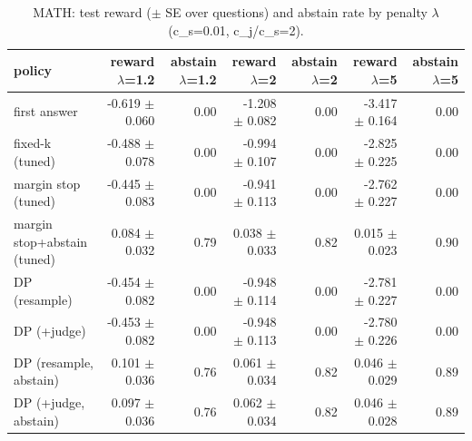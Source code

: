 \begin{table}[t]
\centering
\small
\caption{MATH: test reward ($\pm$ SE over questions) and abstain rate by penalty $\lambda$ (c\_s=0.01, c\_j/c\_s=2).}
\label{tab:reward_vs_lambda_math}
\begin{tabular}{lrrrrrr}
\toprule
policy & reward $\lambda$=1.2 & abstain $\lambda$=1.2 & reward $\lambda$=2 & abstain $\lambda$=2 & reward $\lambda$=5 & abstain $\lambda$=5 \\
\midrule
first answer & -0.619 $\pm$ 0.060 & 0.00 & -1.208 $\pm$ 0.082 & 0.00 & -3.417 $\pm$ 0.164 & 0.00 \\
fixed-k (tuned) & -0.488 $\pm$ 0.078 & 0.00 & -0.994 $\pm$ 0.107 & 0.00 & -2.825 $\pm$ 0.225 & 0.00 \\
margin stop (tuned) & -0.445 $\pm$ 0.083 & 0.00 & -0.941 $\pm$ 0.113 & 0.00 & -2.762 $\pm$ 0.227 & 0.00 \\
margin stop+abstain (tuned) & 0.084 $\pm$ 0.032 & 0.79 & 0.038 $\pm$ 0.033 & 0.82 & 0.015 $\pm$ 0.023 & 0.90 \\
DP (resample) & -0.454 $\pm$ 0.082 & 0.00 & -0.948 $\pm$ 0.114 & 0.00 & -2.781 $\pm$ 0.227 & 0.00 \\
DP (+judge) & -0.453 $\pm$ 0.082 & 0.00 & -0.948 $\pm$ 0.113 & 0.00 & -2.780 $\pm$ 0.226 & 0.00 \\
DP (resample, abstain) & 0.101 $\pm$ 0.036 & 0.76 & 0.061 $\pm$ 0.034 & 0.82 & 0.046 $\pm$ 0.029 & 0.89 \\
DP (+judge, abstain) & 0.097 $\pm$ 0.036 & 0.76 & 0.062 $\pm$ 0.034 & 0.82 & 0.046 $\pm$ 0.028 & 0.89 \\
\bottomrule
\end{tabular}
\end{table}
